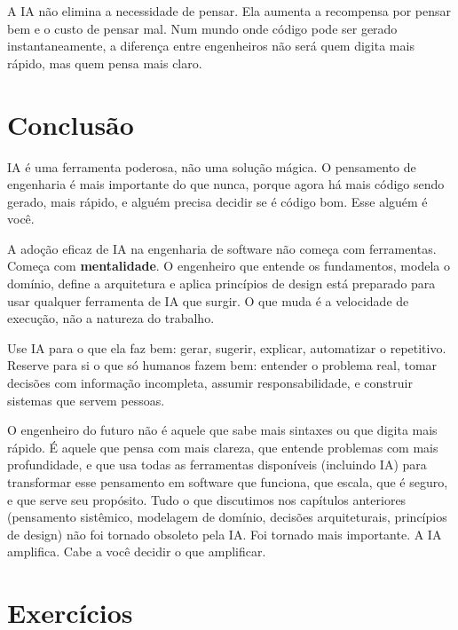 A IA não elimina a necessidade de pensar. Ela aumenta a recompensa por pensar bem
e o custo de pensar mal. Num mundo onde código pode ser gerado instantaneamente, a
diferença entre engenheiros não será quem digita mais rápido, mas quem pensa mais
claro.

\section{Conclusão}

IA é uma ferramenta poderosa, não uma solução mágica. O pensamento de
engenharia é mais importante do que nunca, porque agora há mais código
sendo gerado, mais rápido, e alguém precisa decidir se é código bom. Esse
alguém é você.

A adoção eficaz de IA na engenharia de software não começa com ferramentas.
Começa com \textbf{mentalidade}. O engenheiro que entende os
fundamentos, modela o domínio, define a arquitetura e aplica princípios de
design está preparado para usar qualquer ferramenta de IA que surgir. O
que muda é a velocidade de execução, não a natureza do trabalho.

Use IA para o que ela faz bem: gerar, sugerir, explicar, automatizar o
repetitivo. Reserve para si o que só humanos fazem bem: entender o
problema real, tomar decisões com informação incompleta, assumir
responsabilidade, e construir sistemas que servem pessoas.

O engenheiro do futuro não é aquele que sabe mais sintaxes ou que digita mais rápido.
É aquele que pensa com mais clareza, que entende problemas com mais profundidade, e
que usa todas as ferramentas disponíveis (incluindo IA) para transformar esse
pensamento em software que funciona, que escala, que é seguro, e que serve seu
propósito. Tudo o que discutimos nos capítulos anteriores (pensamento sistêmico,
modelagem de domínio, decisões arquiteturais, princípios de design) não foi
tornado obsoleto pela IA. Foi tornado mais importante. A IA amplifica. Cabe a você
decidir o que amplificar.

\section*{Exercícios}

